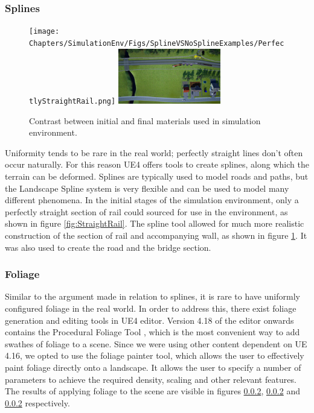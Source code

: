 \subsubsection{Splines}

\begin{figure}
    \centering
    \texttt{[image: Chapters/SimulationEnv/Figs/SplineVSNoSplineExamples/PerfectlyStraightRail.png]}
    \label{fig:StraightRail}
    \includegraphics[width=0.4\textwidth]{Chapters/SimulationEnv/Figs/SplineVSNoSplineExamples/resized_SplineExample1.png}
    \label{fig:SplinedRail}
    \caption{Contrast between initial and final materials used in simulation environment.}
    
\end{figure}

Uniformity tends to be rare in the real world; perfectly straight lines don't often occur naturally. For this reason UE4 offers tools to create splines, along which the terrain can be deformed. Splines are typically used to model roads and paths, but the Landscape Spline system is very flexible and can be used to model many different phenomena. In the initial stages of the simulation environment, only a perfectly straight section of rail could sourced for use in the environment, as shown in figure \ref{fig:StraightRail}. The spline tool allowed for much more realistic construction of the section of rail and accompanying wall, as shown in figure \ref{fig:SplinedRail}. It was also used to create the road and the bridge section. 


\subsubsection{Foliage}
Similar to the argument made in relation to splines, it is rare to have uniformly configured foliage in the real world. In order to address this, there exist foliage generation and editing tools in UE4 editor. Version 4.18 of the editor onwards contains the Procedural Foliage Tool , which is the most convenient way to add swathes of foliage to a scene. Since we were using other content dependent on UE 4.16, we opted to use the foliage painter tool, which allows the user to effectively paint foliage directly onto a landscape. It allows the user to specify a number of parameters to achieve the required density, scaling and other relevant features. The results of applying foliage to the scene are visible in figures \ref{}, \ref{} and \ref{} respectively.

